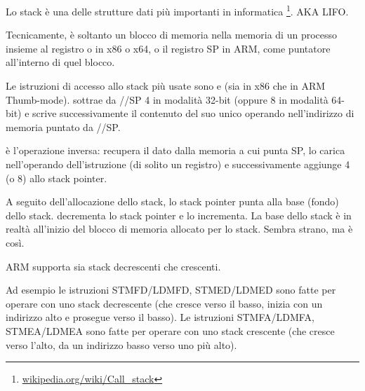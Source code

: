 \mysection{\Stack}
\label{sec:stack}
\myindex{\Stack}

Lo stack è una delle strutture dati più importanti in informatica
\footnote{\href{http://en.wikipedia.org/wiki/Call_stack}{wikipedia.org/wiki/Call\_stack}}.
\ac{AKA} \ac{LIFO}.

Tecnicamente, è soltanto un blocco di memoria nella memoria di un processo insieme al registro \ESP o \RSP in x86 o x64, o il registro \ac{SP} in ARM, come puntatore all'interno di quel blocco.

Le istruzioni di accesso allo stack più usate sono \PUSH e \POP (sia in x86 che in ARM Thumb-mode).
\PUSH sottrae da \ESP/\RSP/\ac{SP} 4 in modalità 32-bit (oppure 8 in modalità 64-bit) e scrive successivamente il contenuto del suo unico operando nell'indirizzo di memoria puntato da \ESP/\RSP/\ac{SP}.

\POP è l'operazione inversa: recupera il dato dalla memoria a cui punta \ac{SP}, lo carica nell'operando dell'istruzione (di solito un registro)
e successivamente aggiunge 4 (o 8) allo \gls{stack pointer}.

A seguito dell'allocazione dello stack, lo \gls{stack pointer} punta alla base (fondo) dello stack.
\PUSH decrementa lo \gls{stack pointer} e \POP lo incrementa.
La base dello stack è in realtà all'inizio del blocco di memoria allocato per lo stack. Sembra strano, ma è così.

ARM supporta sia stack decrescenti che crescenti.


Ad esempio le istruzioni \ac{STMFD}/\ac{LDMFD}, \ac{STMED}/\ac{LDMED} sono fatte per operare con uno stack decrescente (che cresce verso il basso, inizia con un indirizzo alto e prosegue verso il basso).
Le istruzioni \ac{STMFA}/\ac{LDMFA}, \ac{STMEA}/\ac{LDMEA} sono fatte per operare con uno stack crescente (che cresce verso l'alto, da un indirizzo basso verso uno più alto).


